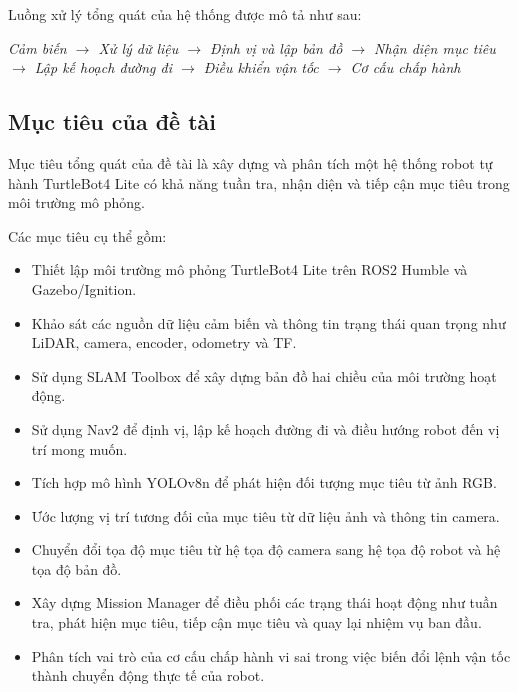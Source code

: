 Luồng xử lý tổng quát của hệ thống được mô tả như sau:

\begin{center}
\textit{Cảm biến $\rightarrow$ Xử lý dữ liệu $\rightarrow$ Định vị và lập bản đồ 
$\rightarrow$ Nhận diện mục tiêu $\rightarrow$ Lập kế hoạch đường đi 
$\rightarrow$ Điều khiển vận tốc $\rightarrow$ Cơ cấu chấp hành}
\end{center}

\subsection{Mục tiêu của đề tài}

Mục tiêu tổng quát của đề tài là xây dựng và phân tích một hệ thống robot tự hành TurtleBot4 Lite có khả năng tuần tra, nhận diện và tiếp cận mục tiêu trong môi trường mô phỏng.

Các mục tiêu cụ thể gồm:

\begin{itemize}
    \item Thiết lập môi trường mô phỏng TurtleBot4 Lite trên ROS2 Humble và Gazebo/Ignition.
    
    \item Khảo sát các nguồn dữ liệu cảm biến và thông tin trạng thái quan trọng như LiDAR, camera, encoder, odometry và TF.
    
    \item Sử dụng SLAM Toolbox để xây dựng bản đồ hai chiều của môi trường hoạt động.
    
    \item Sử dụng Nav2 để định vị, lập kế hoạch đường đi và điều hướng robot đến vị trí mong muốn.
    
    \item Tích hợp mô hình YOLOv8n để phát hiện đối tượng mục tiêu từ ảnh RGB.
    
    \item Ước lượng vị trí tương đối của mục tiêu từ dữ liệu ảnh và thông tin camera.
    
    \item Chuyển đổi tọa độ mục tiêu từ hệ tọa độ camera sang hệ tọa độ robot và hệ tọa độ bản đồ.
    
    \item Xây dựng Mission Manager để điều phối các trạng thái hoạt động như tuần tra, phát hiện mục tiêu, tiếp cận mục tiêu và quay lại nhiệm vụ ban đầu.
    
    \item Phân tích vai trò của cơ cấu chấp hành vi sai trong việc biến đổi lệnh vận tốc thành chuyển động thực tế của robot.
\end{itemize}

